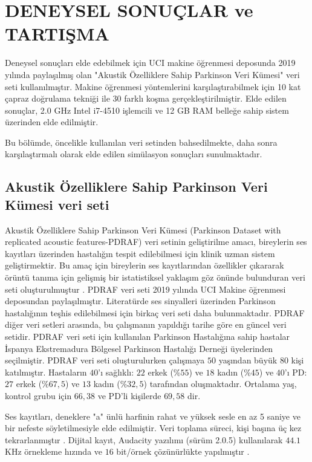 \documentclass[conference]{IEEEtran}
\begin{document}
\section{DENEYSEL SONUÇLAR ve TARTIŞMA}

Deneysel sonuçları elde edebilmek için UCI makine öğrenmesi deposunda 2019 yılında paylaşılmış olan "Akustik Özelliklere Sahip Parkinson Veri Kümesi" veri seti \cite{naranjo2016addressing,naranjo2017two} kullanılmıştır. Makine öğrenmesi yöntemlerini karşılaştırabilmek için 10 kat çapraz doğrulama tekniği ile 30 farklı koşma gerçekleştirilmiştir. Elde edilen sonuçlar, 2.0 GHz Intel i7-4510 işlemcili ve 12 GB RAM belleğe sahip sistem üzerinden elde edilmiştir.

Bu bölümde, öncelikle kullanılan veri setinden bahsedilmekte, daha sonra karşılaştırmalı olarak elde edilen simülasyon sonuçları sunulmaktadır.

\subsection{Akustik Özelliklere Sahip Parkinson Veri Kümesi veri seti}

Akustik Özelliklere Sahip Parkinson Veri Kümesi (Parkinson Dataset with replicated acoustic features-PDRAF) veri setinin geliştirilme amacı, bireylerin ses kayıtları üzerinden hastalığın tespit edilebilmesi için  klinik uzman sistem geliştirmektir. Bu amaç için bireylerin ses kayıtlarından özellikler çıkararak  örüntü tanıma için gelişmiş bir istatistiksel yaklaşım göz önünde bulunduran  veri seti oluşturulmuştur \cite{naranjo2016addressing}. PDRAF veri seti 2019 yılında UCI Makine öğrenmesi \cite{UCI} deposundan paylaşılmıştır. Literatürde ses sinyalleri üzerinden Parkinson hastalığının teşhis edilebilmesi için birkaç veri seti daha bulunmaktadır. PDRAF  diğer veri setleri arasında, bu çalışmanın yapıldığı tarihe göre en güncel veri setidir. PDRAF veri seti için kullanılan Parkinson Hastalığına sahip hastalar İspanya Ekstremadura Bölgesel Parkinson Hastalığı Derneği üyelerinden seçilmiştir\cite{naranjo2016addressing}. PDRAF veri seti oluşturulurken çalışmaya $50$ yaşından büyük $80$ kişi katılmıştır. Hastaların $40$'ı sağlıklı: $22$ erkek ($\% 55$) ve $18$ kadın ($\% 45$) ve $40$'ı PD: $27$ erkek ($\% 67,5$) ve $13$ kadın ($\% 32,5$) tarafından oluşmaktadır. Ortalama yaş, kontrol grubu için $66,38$ ve PD'li kişilerde $69,58$ dir.

Ses kayıtları, deneklere  "a"  ünlü harfinin rahat ve yüksek sesle en az 5 saniye ve bir nefeste söyletilmesiyle elde edilmiştir. Veri toplama süreci, kişi başına üç kez tekrarlanmıştır \cite{naranjo2016addressing}. Dijital kayıt, Audacity yazılımı (sürüm 2.0.5) kullanılarak $44.1$ KHz örnekleme hızında ve $16$ bit/örnek çözünürlükte yapılmıştır \cite{naranjo2016addressing}.
\end{document}
